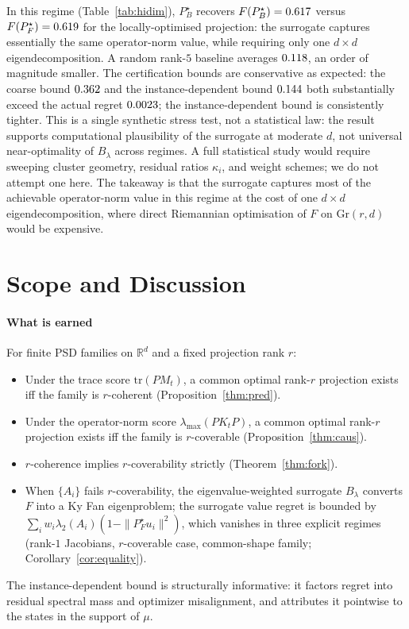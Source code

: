 \documentclass[final,3p,times]{elsarticle}
\newcommand{\Gr}{\mathrm{Gr}}
\newcommand{\tr}{\mathrm{tr}}
\newcommand{\R}{\mathbb{R}}
\begin{document}
In this regime (Table~\ref{tab:hidim}), $P_B^\star$ recovers
$F(P_B^\star)=0.617$ versus $F(P_F^\star)=0.619$ for the
locally-optimised projection: the surrogate captures essentially the
same operator-norm value, while requiring only one $d\times d$
eigendecomposition.
A random rank-$5$ baseline averages $0.118$, an order of
magnitude smaller.
The certification bounds are conservative as expected: the coarse
bound $0.362$ and the instance-dependent bound $0.144$
both substantially exceed the actual regret $0.0023$; the
instance-dependent bound is consistently tighter.
This is a single synthetic stress test, not a statistical law: the
result supports computational plausibility of the surrogate at moderate
$d$, not universal near-optimality of $B_\lambda$ across regimes.
A full statistical study would require sweeping cluster geometry,
residual ratios $\kappa_i$, and weight schemes; we do not attempt one
here.
The takeaway is that the surrogate captures most of the achievable
operator-norm value in this regime at the cost of one $d\times d$
eigendecomposition, where direct Riemannian optimisation of $F$ on
$\Gr(r,d)$ would be expensive.

\section{Scope and Discussion}
\label{sec:scope}

\paragraph{What is earned}
For finite PSD families on $\R^d$ and a fixed projection rank $r$:
\begin{itemize}
\item Under the trace score $\tr(PM_t)$, a common optimal rank-$r$
projection exists iff the family is $r$-coherent
(Proposition~\ref{thm:pred}).
\item Under the operator-norm score $\lambda_{\max}(PK_tP)$, a common
optimal rank-$r$ projection exists iff the family is $r$-coverable
(Proposition~\ref{thm:caus}).
\item $r$-coherence implies $r$-coverability strictly
(Theorem~\ref{thm:fork}).
\item When $\{A_i\}$ fails $r$-coverability, the eigenvalue-weighted
surrogate $B_\lambda$ converts $F$ into a Ky Fan eigenproblem; the
surrogate value regret is bounded by
$\sum_i w_i\lambda_2(A_i)(1-\|P_F^\star u_i\|^2)$, which vanishes in
three explicit regimes (rank-$1$ Jacobians, $r$-coverable case,
common-shape family; Corollary~\ref{cor:equality}).
\end{itemize}
The instance-dependent bound is structurally informative: it factors
regret into residual spectral mass and optimizer misalignment, and
attributes it pointwise to the states in the support of $\mu$.
\end{document}
